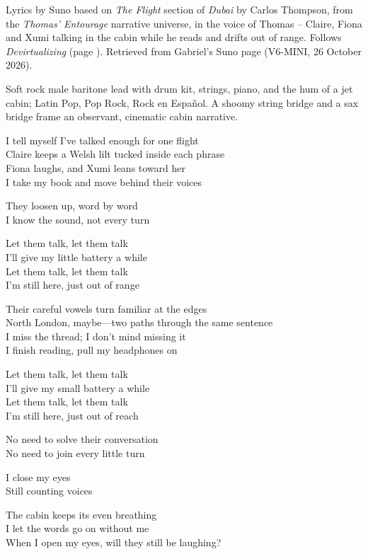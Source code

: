 
\label{sec:just-out-of-range}
\begin{notes}
Lyrics by Suno based on \emph{The Flight} section of \emph{Dubai} by Carlos Thompson, from the \emph{Thomas' Entourage} narrative universe, in the voice of Thomas -- Claire, Fiona and Xumi talking in the cabin while he reads and drifts out of range. Follows \emph{Devirtualizing} (page \pageref{sec:devirtualizing}). Retrieved from Gabriel's Suno page (V6-MINI, 26 October 2026).
\end{notes}
\begin{style}
Soft rock male baritone lead with drum kit, strings, piano, and the hum of a jet cabin; Latin Pop, Pop Rock, Rock en Español. A shoomy string bridge and a sax bridge frame an observant, cinematic cabin narrative.
\end{style}
\begin{lyrics}
I tell myself I’ve talked enough for one flight\\
Claire keeps a Welsh lilt tucked inside each phrase\\
Fiona laughs, and Xumi leans toward her\\
I take my book and move behind their voices

They loosen up, word by word\\
I know the sound, not every turn

Let them talk, let them talk\\
I’ll give my little battery a while\\
Let them talk, let them talk\\
I’m still here, just out of range

Their careful vowels turn familiar at the edges\\
North London, maybe—two paths through the same sentence\\
I miss the thread; I don’t mind missing it\\
I finish reading, pull my headphones on

Let them talk, let them talk\\
I’ll give my small battery a while\\
Let them talk, let them talk\\
I’m still here, just out of reach

No need to solve their conversation\\
No need to join every little turn

I close my eyes\\
Still counting voices

The cabin keeps its even breathing\\
I let the words go on without me\\
When I open my eyes, will they still be laughing?
\end{lyrics}

